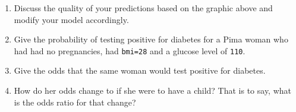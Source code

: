 \documentclass[]{book}
\newenvironment{Shaded}{\begin{snugshade}}{\end{snugshade}}
\newcommand{\KeywordTok}[1]{\textcolor[rgb]{0.13,0.29,0.53}{\textbf{{#1}}}}
\newcommand{\DataTypeTok}[1]{\textcolor[rgb]{0.13,0.29,0.53}{{#1}}}
\newcommand{\DecValTok}[1]{\textcolor[rgb]{0.00,0.00,0.81}{{#1}}}
\newcommand{\StringTok}[1]{\textcolor[rgb]{0.31,0.60,0.02}{{#1}}}
\newcommand{\OtherTok}[1]{\textcolor[rgb]{0.56,0.35,0.01}{{#1}}}
\newcommand{\NormalTok}[1]{{#1}}
\theoremstyle{definition}
\theoremstyle{definition}
\theoremstyle{remark}
\begin{document}
\begin{enumerate}
\begin{enumerate}
\begin{Shaded}
\end{Shaded}
  \item
    Discuss the quality of your predictions based on the graphic above
    and modify your model accordingly.\\
  \item
    Give the probability of testing positive for diabetes for a Pima
    woman who had had no pregnancies, had \texttt{bmi=28} and a glucose
    level of \texttt{110}.
  \item
    Give the odds that the same woman would test positive for diabetes.
  \item
    How do her odds change to if she were to have a child? That is to
    say, what is the odds ratio for that change?
  \end{enumerate}
\end{enumerate}


\end{document}
